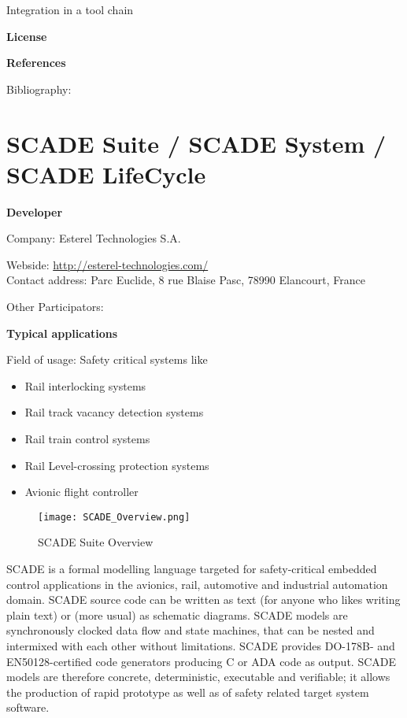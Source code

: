 

	Integration in a tool chain



	\textbf{License}


	\textbf{References}

	Bibliography:


\section{SCADE Suite / SCADE System / SCADE LifeCycle}

	\textbf{Developer}

	Company: Esterel Technologies S.A.

	Webside: \url{http://esterel-technologies.com/} \\[2pt]

	Contact address: Parc Euclide, 8 rue Blaise Pasc, 78990 Elancourt, France

	Other  Participators:

	\textbf{Typical applications}

	Field of usage:
	Safety critical systems like
\vspace{-10pt}
\begin{itemize}[topsep=2pt, partopsep=2pt,itemsep=2pt,parsep=2pt]
  \item Rail interlocking systems
  \item Rail track vacancy detection systems
  \item Rail train control systems
  \item Rail Level-crossing protection systems
  \item Avionic flight controller
\end{itemize}

\begin{figure}[h]
\centering
\texttt{[image: SCADE\_Overview.png]}
\caption{SCADE Suite Overview}
\label{fig:SCADE_Suite_Overview}
\end{figure}

	
SCADE is a formal modelling language targeted for safety-critical embedded control applications in the avionics, rail, automotive and industrial automation domain. SCADE source code can be written as text (for anyone who likes writing plain text) or (more usual) as schematic diagrams. SCADE models are synchronously clocked data flow and state machines, that can be nested and intermixed with each other without limitations. 
SCADE provides DO-178B- and EN50128-certified code generators producing C or ADA code as output. SCADE models are therefore concrete, deterministic, executable and verifiable; it allows the production of rapid prototype as well as of safety related target system software. 

